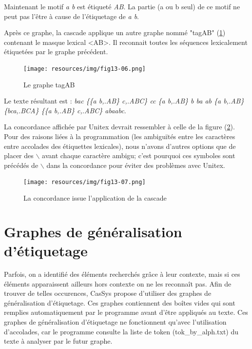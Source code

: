 \bigskip
\noindent Maintenant le motif \emph{a b} est étiqueté \emph{AB}. La partie (a ou b seul) de ce
motif ne peut pas l'être à cause de l'étiquetage de \emph{a b}.

\bigskip
\noindent Après ce graphe, la cascade applique un autre graphe nommé "tagAB" (\ref{fig13-06})
contenant le masque lexical <AB>. Il reconnait toutes les séquences lexicalement étiquetées par le
graphe précédent.

\begin{figure}[!htb]
  \centering
  \texttt{[image: resources/img/fig13-06.png]}
  \caption{Le graphe tagAB}
  \label{fig13-06}
\end{figure}

\bigskip
\noindent Le texte résultant est : \emph{bac \{\{a b,.AB\} c,.ABC\} cc \{a b,.AB\} b ba ab \{a
b,.AB\} \{bca,.BCA\} \{\{a b,.AB\} c,.ABC\} abaabc}.


\bigskip
\noindent La concordance affichée par Unitex devrait ressembler à celle de la figure
(\ref{fig13-07}). Pour des raisons liées à la programmation (les ambiguïtés entre les
	caractères entre accolades des étiquettes lexicales), nous n'avons d'autres options que de
placer des  $\backslash$ avant chaque caractère ambigu; c'est pourquoi ces symboles sont précédés de
$\backslash$ dans la concordance pour éviter des problèmes avec Unitex.

\begin{figure}[!htb]
  \centering
  \texttt{[image: resources/img/fig13-07.png]}
  \caption{La concordance issue l'application de la cascade}
  \label{fig13-07}
\end{figure}

\section{Graphes de g\'{e}n\'{e}ralisation d'\'{e}tiquetage}

Parfois, on a identifi\'{e} des \'{e}l\'{e}ments recherch\'{e}s gr\^{a}ce \`{a} leur contexte, mais si ces \'{e}l\'{e}ments apparaissent ailleurs hors contexte on ne les reconna\^{i}t pas. Afin de trouver de telles occurences, CasSys propose d'utiliser des graphes de g\'{e}n\'{e}ralisation d'\'{e}tiquetage. Ces graphes contiennent des bo\^{i}tes vides qui sont remplies automatiquement par le programme avant d'\^{e}tre appliqu\'{e}s au texte. Ces graphes de g\'{e}n\'{e}ralisation d'\'{e}tiquetage ne fonctionnent qu'avec l'utilisation d'accolades, car le programme consulte la liste de token (tok\_by\_alph.txt) du texte \`{a} analyser par le futur graphe.

